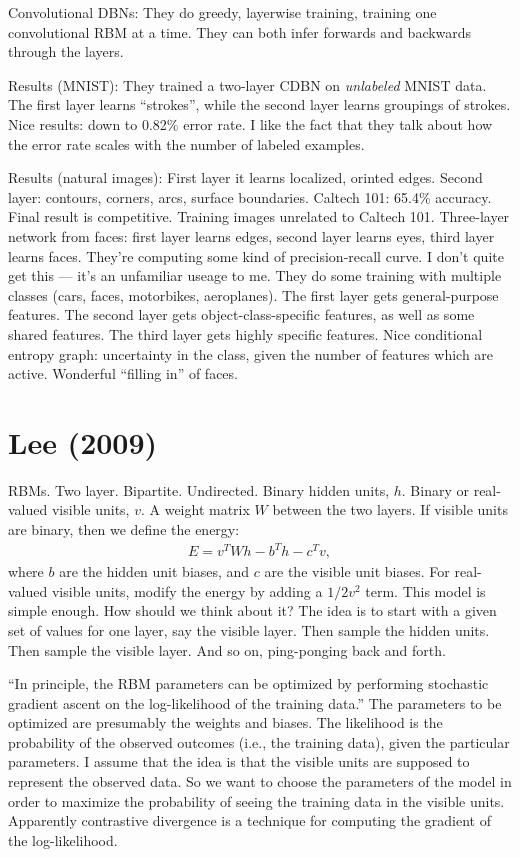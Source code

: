\documentclass[12pt]{report}
\begin{document}
Convolutional DBNs: They do greedy, layerwise training, training one
convolutional RBM at a time.  They can both infer forwards and
backwards through the layers.

Results (MNIST): They trained a two-layer CDBN on \emph{unlabeled}
MNIST data.  The first layer learns ``strokes'', while the second
layer learns groupings of strokes.  Nice results: down to 0.82\% error
rate.  I like the fact that they talk about how the error rate scales
with the number of labeled examples.

Results (natural images): First layer it learns localized, orinted
edges.  Second layer: contours, corners, arcs, surface boundaries.
Caltech 101: 65.4\% accuracy.  Final result is competitive.  Training
images unrelated to Caltech 101.  Three-layer network from faces:
first layer learns edges, second layer learns eyes, third layer learns
faces.  They're computing some kind of precision-recall curve.  I
don't quite get this --- it's an unfamiliar useage to me.  They do
some training with multiple classes (cars, faces, motorbikes,
aeroplanes).  The first layer gets general-purpose features.  The
second layer gets object-class-specific features, as well as some
shared features.  The third layer gets highly specific features.  Nice
conditional entropy graph: uncertainty in the class, given the number
of features which are active.  Wonderful ``filling in'' of faces.

\section{Lee (2009)} 

RBMs.  Two layer.  Bipartite.  Undirected.  Binary hidden units, $h$.
Binary or real-valued visible units, $v$.  A weight matrix $W$ between
the two layers.  If visible units are binary, then we define the
energy:
\begin{eqnarray}
  E = v^T W h - b^T h-c^T v,
\end{eqnarray}
where $b$ are the hidden unit biases, and $c$ are the visible unit
biases.  For real-valued visible units, modify the energy by adding a
$1/2 v^2$ term.  This model is simple enough.  How should we think
about it?  The idea is to start with a given set of values for one
layer, say the visible layer.  Then sample the hidden units.  Then
sample the visible layer.  And so on, ping-ponging back and forth.

``In principle, the RBM parameters can be optimized by performing
stochastic gradient ascent on the log-likelihood of the training
data.''  The parameters to be optimized are presumably the weights and
biases.  The likelihood is the probability of the observed outcomes
(i.e., the training data), given the particular parameters.  I assume
that the idea is that the visible units are supposed to represent the
observed data.  So we want to choose the parameters of the model in
order to maximize the probability of seeing the training data in the
visible units.  Apparently contrastive divergence is a technique for
computing the gradient of the log-likelihood.
\end{document}
